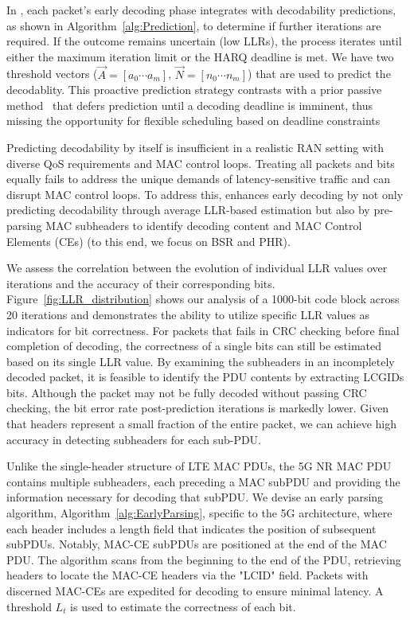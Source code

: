 In \Name{}, each packet's early decoding phase integrates with decodability predictions, as shown in Algorithm~\ref{alg:Prediction}, to determine if further iterations are required. If the outcome remains uncertain (low LLRs), the process iterates until either the maximum iteration limit or the HARQ deadline is met. 
We have two threshold vectors ($\vec{A}=[a_{0} \dotsm a_{m}]$, $\vec{N}=[n_{0} \dotsm n_{m}]$) that are used to predict the decodablity.
This proactive prediction strategy contrasts with a prior passive method~\cite{Nuberu} that defers prediction until a decoding deadline is imminent, thus missing the opportunity for flexible scheduling based on deadline constraints

Predicting decodability by itself is insufficient in a realistic RAN setting with diverse QoS requirements and MAC control loops. Treating all packets and bits equally fails to address the unique demands of latency-sensitive traffic and can disrupt MAC control loops. To address this, \Name{} enhances early decoding by not only predicting decodability through average LLR-based estimation but also by pre-parsing MAC subheaders to identify decoding content and MAC Control Elements (CEs) (to this end, we focus on BSR and PHR).

We assess the correlation between the evolution of individual LLR values over iterations and the accuracy of their corresponding bits. Figure~\ref{fig:LLR_distribution} shows our analysis of a 1000-bit code block across 20 iterations and demonstrates the ability to utilize specific LLR values as indicators for bit correctness.
For packets that fails in CRC checking before final completion of decoding, the correctness of a single bits can still be estimated based on its single LLR value.
By examining the subheaders in an incompletely decoded packet, it is feasible to identify the PDU contents by extracting LCGIDs bits. Although the packet may not be fully decoded without passing CRC checking, the bit error rate post-prediction iterations is markedly lower. Given that headers represent a small fraction of the entire packet, we can achieve high accuracy in detecting subheaders for each sub-PDU.

Unlike the single-header structure of LTE MAC PDUs, the 5G NR MAC PDU contains multiple subheaders, each preceding a MAC subPDU and providing the information necessary for decoding that subPDU.
We devise an early parsing algorithm, Algorithm~\ref{alg:EarlyParsing}, specific to the 5G architecture, where each header includes a length field that indicates the position of subsequent subPDUs. Notably, MAC-CE subPDUs are positioned at the end of the MAC PDU. The algorithm scans from the beginning to the end of the PDU, retrieving headers to locate the MAC-CE headers via the "LCID" field. Packets with discerned MAC-CEs are expedited for decoding to ensure minimal latency. A threshold $L_t$ is used to estimate the correctness of each bit. 


